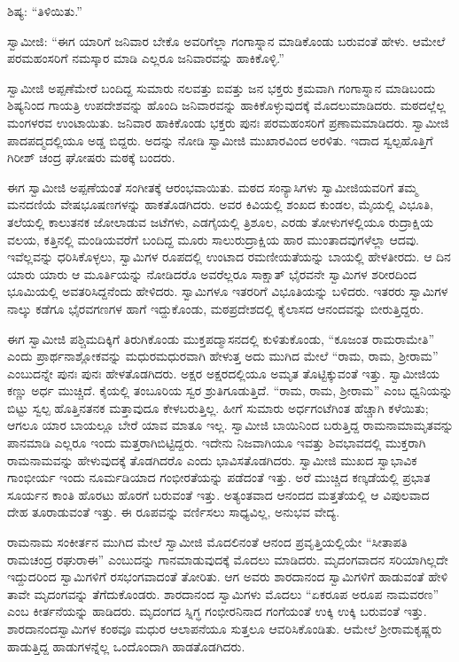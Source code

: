  ಶಿಷ್ಯ: “ತಿಳಿಯಿತು.” 

 ಸ್ವಾಮೀಜಿ: “ಈಗ ಯಾರಿಗೆ ಜನಿವಾರ ಬೇಕೊ ಅವರಿಗೆಲ್ಲಾ ಗಂಗಾಸ್ನಾನ ಮಾಡಿಕೊಂಡು ಬರುವಂತೆ ಹೇಳು. ಆಮೇಲೆ ಪರಮಹಂಸರಿಗೆ ನಮಸ್ಕಾರ ಮಾಡಿ ಎಲ್ಲರೂ ಜನಿವಾರವನ್ನು ಹಾಕಿಕೊಳ್ಳಿ.” 

 ಸ್ವಾಮೀಜಿ ಅಪ್ಪಣೆಮೇರೆ ಬಂದಿದ್ದ ಸುಮಾರು ನಲವತ್ತು ಐವತ್ತು ಜನ ಭಕ್ತರು ಕ್ರಮವಾಗಿ ಗಂಗಾಸ್ನಾನ ಮಾಡಿಬಂದು ಶಿಷ್ಯನಿಂದ ಗಾಯತ್ರಿ ಉಪದೇಶವನ್ನು ಹೊಂದಿ ಜನಿವಾರವನ್ನು ಹಾಕಿಕೊಳ್ಳುವುದಕ್ಕೆ ಮೊದಲುಮಾಡಿದರು. ಮಠದಲ್ಲೆಲ್ಲ ಮಂಗಳರವ ಉಂಟಾಯಿತು. ಜನಿವಾರ ಹಾಕಿಕೊಂಡು ಭಕ್ತರು ಪುನಃ ಪರಮಹಂಸರಿಗೆ ಪ್ರಣಾಮಮಾಡಿದರು. ಸ್ವಾಮೀಜಿ ಪಾದಪದ್ಮದಲ್ಲಿಯೂ ಅಡ್ಡ ಬಿದ್ದರು. ಅದನ್ನು ನೋಡಿ ಸ್ವಾಮೀಜಿ ಮುಖಾರವಿಂದ ಅರಳಿತು. ಇದಾದ ಸ್ವಲ್ಪಹೊತ್ತಿಗೆ ಗಿರೀಶ್ ಚಂದ್ರ ಘೋಷರು ಮಠಕ್ಕೆ ಬಂದರು. 

 ಈಗ ಸ್ವಾಮೀಜಿ ಅಪ್ಪಣೆಯಂತೆ ಸಂಗೀತಕ್ಕೆ ಆರಂಭವಾಯಿತು. ಮಠದ ಸಂನ್ಯಾಸಿಗಳು ಸ್ವಾಮೀಜಿಯವರಿಗೆ ತಮ್ಮ ಮನದಣಿಯೆ ವೇಷಭೂಷಣಗಳನ್ನು ಹಾಕತೊಡಗಿದರು. ಅವರ ಕಿವಿಯಲ್ಲಿ ಶಂಖದ ಕುಂಡಲ, ಮೈಯಲ್ಲಿ ವಿಭೂತಿ, ತಲೆಯಲ್ಲಿ ಕಾಲುತನಕ ಜೋಲಾಡುವ ಜಟೆಗಳು, ಎಡಗೈಯಲ್ಲಿ ತ್ರಿಶೂಲ, ಎರಡು ತೋಳುಗಳಲ್ಲಿಯೂ ರುದ್ರಾಕ್ಷಿಯ ವಲಯ, ಕತ್ತಿನಲ್ಲಿ ಮಂಡಿಯವರೆಗೆ ಬಂದಿದ್ದ ಮೂರು ಸಾಲು\break ರುದ್ರಾಕ್ಷಿಯ ಹಾರ ಮುಂತಾದವುಗಳೆಲ್ಲಾ ಆದವು. ಇವೆಲ್ಲವನ್ನು ಧರಿಸಿಕೊಳ್ಳಲು, ಸ್ವಾಮಿಗಳ ರೂಪದಲ್ಲಿ ಉಂಟಾದ ರಮಣೀಯತೆಯನ್ನು ಬಾಯಲ್ಲಿ ಹೇಳತೀರದು. ಆ ದಿನ ಯಾರು ಯಾರು ಆ ಮೂರ್ತಿಯನ್ನು ನೋಡಿದರೊ ಅವರೆಲ್ಲರೂ ಸಾಕ್ಷಾತ್ ಭೈರವನೇ‌ ಸ್ವಾಮಿಗಳ ಶರೀರದಿಂದ ಭೂಮಿಯಲ್ಲಿ ಅವತರಿಸಿದ್ದನೆಂದು ಹೇಳಿದರು. ಸ್ವಾಮಿಗಳೂ ಇತರರಿಗೆ ವಿಭೂತಿಯನ್ನು ಬಳಿದರು. ಇತರರು ಸ್ವಾಮಿಗಳ ನಾಲ್ಕು ಕಡೆಗೂ ಭೈರವಗಣಗಳ ಹಾಗೆ ಇದ್ದುಕೊಂಡು, ಮಠಪ್ರದೇಶದಲ್ಲಿ ಕೈಲಾಸದ ಆನಂದವನ್ನು ಬೀರುತ್ತಿದ್ದರು. 

 ಈಗ ಸ್ವಾಮೀಜಿ ಪಶ್ಚಿಮದಿಕ್ಕಿಗೆ ತಿರುಗಿಕೊಂಡು ಮುಕ್ತಪದ್ಮಾಸನದಲ್ಲಿ ಕುಳಿತುಕೊಂಡು, “ಕೂಜಂತ ರಾಮರಾಮೇತಿ” ಎಂದು ಪ್ರಾರ್ಥನಾಶ್ಲೋಕವನ್ನು ಮಧುರಮಧುರವಾಗಿ ಹೇಳುತ್ತ ಅದು ಮುಗಿದ ಮೇಲೆ “ರಾಮ, ರಾಮ, ಶ‍್ರೀರಾಮ” ಎಂಬುದನ್ನೇ ಪುನಃ ಪುನಃ ಹೇಳತೊಡಗಿದರು. ಅಕ್ಷರ ಅಕ್ಷರದಲ್ಲಿಯೂ ಅಮೃತ ತೊಟ್ಟಿಕ್ಕುವಂತೆ ಇತ್ತು. ಸ್ವಾಮೀಜಿಯ ಕಣ್ಣು ಅರ್ಧ ಮುಚ್ಚಿದೆ. ಕೈಯಲ್ಲಿ ತಂಬೂರಿಯ ಸ್ವರ ಶ್ರುತಿಗೂಡುತ್ತಿದೆ. “ರಾಮ, ರಾಮ, ಶ‍್ರೀರಾಮ” ಎಂಬ ಧ್ವನಿಯನ್ನು ಬಿಟ್ಟು ಸ್ವಲ್ಪ ಹೊತ್ತಿನತನಕ ಮತ್ತಾವುದೂ ಕೇಳಬರುತ್ತಿಲ್ಲ. ಹೀಗೆ ಸುಮಾರು ಅರ್ಧಗಂಟೆಗಿಂತ ಹೆಚ್ಚಾಗಿ ಕಳೆಯಿತು; ಆಗಲೂ ಯಾರ ಬಾಯಲ್ಲೂ ಬೇರೆ ಯಾವ ಮಾತೂ ಇಲ್ಲ. ಸ್ವಾಮೀಜಿ ಬಾಯಿನಿಂದ ಬರುತ್ತಿದ್ದ ರಾಮನಾಮಾಮೃತವನ್ನು ಪಾನಮಾಡಿ ಎಲ್ಲರೂ ಇಂದು ಮತ್ತರಾಗಿಬಿಟ್ಟಿದ್ದರು. ಇದೇನು ನಿಜವಾಗಿಯೂ ಇವತ್ತು ಶಿವಭಾವದಲ್ಲಿ ಮುಕ್ತರಾಗಿ ರಾಮನಾಮವನ್ನು ಹೇಳುವುದಕ್ಕೆ ತೊಡಗಿದರೊ ಎಂದು ಭಾವಿಸತೊಡಗಿದರು. ಸ್ವಾಮೀಜಿ ಮುಖದ ಸ್ವಾಭಾವಿಕ ಗಾಂಭೀರ್ಯ ಇಂದು ನೂರ್ಮಡಿಯಾದ ಗಂಭೀರತೆಯನ್ನು ಪಡೆದಂತೆ ಇತ್ತು. ಅರೆ ಮುಚ್ಚಿದ ಕಣ್ಕಡೆಯಲ್ಲಿ ಪ್ರಭಾತ ಸೂರ್ಯನ ಕಾಂತಿ ಹೊರಟು ಹೊರಗೆ ಬರುವಂತೆ ಇತ್ತು. ಅತ್ಯಂತವಾದ ಆನಂದದ ಮತ್ತತೆಯಲ್ಲಿ ಆ ವಿಪುಲವಾದ ದೇಹ ತೂರಾಡುವಂತೆ ಇತ್ತು. ಈ ರೂಪವನ್ನು ವರ್ಣಿಸಲು ಸಾಧ್ಯವಿಲ್ಲ, ಅನುಭವ ವೇದ್ಯ. 

 ರಾಮನಾಮ ಸಂಕೀರ್ತನ ಮುಗಿದ ಮೇಲೆ ಸ್ವಾಮೀಜಿ ಮೊದಲಿನಂತೆ ಆನಂದ ಪ್ರವೃತ್ತಿಯಲ್ಲಿಯೇ “ಸೀತಾಪತಿ ರಾಮಚಂದ್ರ ರಘುರಾಈ” ಎಂಬುದನ್ನು ಗಾನಮಾಡುವುದಕ್ಕೆ ಮೊದಲು ಮಾಡಿದರು. ಮೃದಂಗವಾದನ ಸರಿಯಾಗಿಲ್ಲದೇ ಇದ್ದುದರಿಂದ ಸ್ವಾಮಿ\-ಗಳಿಗೆ ರಸಭಂಗವಾದಂತೆ ತೋರಿತು. ಆಗ ಅವರು ಶಾರದಾನಂದ ಸ್ವಾಮಿ\-ಗಳಿಗೆ ಹಾಡುವಂತೆ ಹೇಳಿ ತಾವೇ ಮೃದಂಗವನ್ನು ತೆಗೆದುಕೊಂಡರು. ಶಾರದಾನಂದ ಸ್ವಾಮಿಗಳು ಮೊದಲು “ಏಕರೂಪ ಅರೂಪ ನಾಮವರಣ” ಎಂಬ ಕೀರ್ತನೆಯನ್ನು ಹಾಡಿದರು. ಮೃದಂಗದ ಸ್ನಿಗ್ಧ ಗಂಭೀರನಿನಾದ ಗಂಗೆಯಂತೆ ಉಕ್ಕಿ ಉಕ್ಕಿ ಬರುವಂತೆ ಇತ್ತು. ಶಾರದಾನಂದಸ್ವಾಮಿಗಳ ಕಂಠವೂ ಮಧುರ ಆಲಾಪನೆಯೂ ಸುತ್ತಲೂ ಆವರಿಸಿಕೊಂಡಿತು. ಆಮೇಲೆ ಶ‍್ರೀರಾಮಕೃಷ್ಣರು ಹಾಡುತ್ತಿದ್ದ ಹಾಡುಗಳನ್ನೆಲ್ಲ ಒಂದೊಂದಾಗಿ ಹಾಡತೊಡಗಿದರು. 

